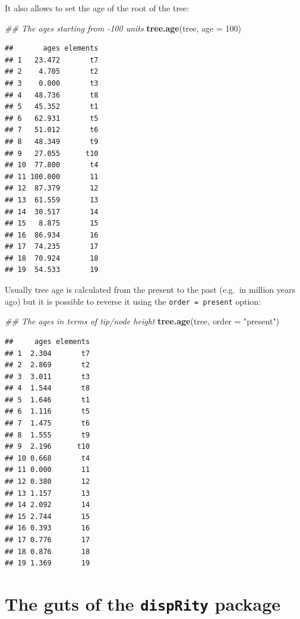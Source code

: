 \documentclass[
]{book}
\newenvironment{Shaded}{\begin{snugshade}}{\end{snugshade}}
\newcommand{\CommentTok}[1]{\textcolor[rgb]{0.56,0.35,0.01}{\textit{#1}}}
\newcommand{\DataTypeTok}[1]{\textcolor[rgb]{0.13,0.29,0.53}{#1}}
\newcommand{\DecValTok}[1]{\textcolor[rgb]{0.00,0.00,0.81}{#1}}
\newcommand{\KeywordTok}[1]{\textcolor[rgb]{0.13,0.29,0.53}{\textbf{#1}}}
\newcommand{\NormalTok}[1]{#1}
\newcommand{\StringTok}[1]{\textcolor[rgb]{0.31,0.60,0.02}{#1}}
\begin{document}
It also allows to set the age of the root of the tree:

\begin{Shaded}
\begin{Highlighting}[]
\CommentTok{\#\# The ages starting from {-}100 units}
\KeywordTok{tree.age}\NormalTok{(tree, }\DataTypeTok{age =} \DecValTok{100}\NormalTok{)}
\end{Highlighting}
\end{Shaded}

\begin{verbatim}
##       ages elements
## 1   23.472       t7
## 2    4.705       t2
## 3    0.000       t3
## 4   48.736       t8
## 5   45.352       t1
## 6   62.931       t5
## 7   51.012       t6
## 8   48.349       t9
## 9   27.055      t10
## 10  77.800       t4
## 11 100.000       11
## 12  87.379       12
## 13  61.559       13
## 14  30.517       14
## 15   8.875       15
## 16  86.934       16
## 17  74.235       17
## 18  70.924       18
## 19  54.533       19
\end{verbatim}

Usually tree age is calculated from the present to the past (e.g.~in million years ago) but it is possible to reverse it using the \texttt{order\ =\ present} option:

\begin{Shaded}
\begin{Highlighting}[]
\CommentTok{\#\# The ages in terms of tip/node height}
\KeywordTok{tree.age}\NormalTok{(tree, }\DataTypeTok{order =} \StringTok{"present"}\NormalTok{)}
\end{Highlighting}
\end{Shaded}

\begin{verbatim}
##     ages elements
## 1  2.304       t7
## 2  2.869       t2
## 3  3.011       t3
## 4  1.544       t8
## 5  1.646       t1
## 6  1.116       t5
## 7  1.475       t6
## 8  1.555       t9
## 9  2.196      t10
## 10 0.668       t4
## 11 0.000       11
## 12 0.380       12
## 13 1.157       13
## 14 2.092       14
## 15 2.744       15
## 16 0.393       16
## 17 0.776       17
## 18 0.876       18
## 19 1.369       19
\end{verbatim}

\hypertarget{the-guts-of-the-disprity-package}{%
\chapter{\texorpdfstring{The guts of the \texttt{dispRity} package}{The guts of the dispRity package}}\label{the-guts-of-the-disprity-package}}
\end{document}
